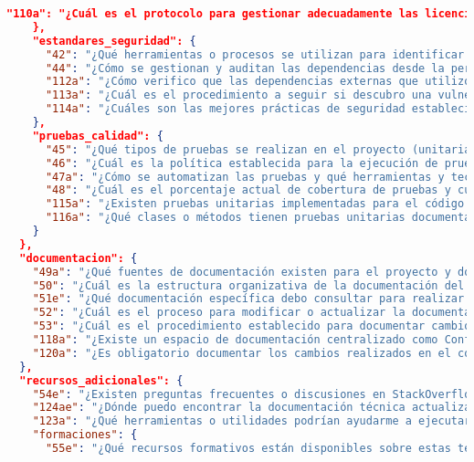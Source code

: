 \begin{lstlisting}[language=json, caption={Listado de elicitación de preguntas procesadas y clasificadas}, label={listado:preguntas}]
      "110a": "¿Cuál es el protocolo para gestionar adecuadamente las licencias de componentes externos?"
    },
    "estandares_seguridad": {
      "42": "¿Qué herramientas o procesos se utilizan para identificar vulnerabilidades de seguridad en el código?",
      "44": "¿Cómo se gestionan y auditan las dependencias desde la perspectiva de seguridad?",
      "112a": "¿Cómo verifico que las dependencias externas que utilizo son seguras y se mantienen actualizadas?",
      "113a": "¿Cuál es el procedimiento a seguir si descubro una vulnerabilidad crítica en una dependencia?",
      "114a": "¿Cuáles son las mejores prácticas de seguridad establecidas que debo aplicar en mi código para este proyecto?"
    },
    "pruebas_calidad": {
      "45": "¿Qué tipos de pruebas se realizan en el proyecto (unitarias, funcionales, integración, rendimiento)?",
      "46": "¿Cuál es la política establecida para la ejecución de pruebas (por commit, por merge request, al final del sprint)?",
      "47a": "¿Cómo se automatizan las pruebas y qué herramientas y tecnologías se utilizan para ello?",
      "48": "¿Cuál es el porcentaje actual de cobertura de pruebas y cuál es el objetivo establecido?",
      "115a": "¿Existen pruebas unitarias implementadas para el código actual? ¿Dónde se encuentran?",
      "116a": "¿Qué clases o métodos tienen pruebas unitarias documentadas y cuáles necesitan implementación?"
    }
  },
  "documentacion": {
    "49a": "¿Qué fuentes de documentación existen para el proyecto y dónde puedo encontrarlas (API, guías, licencias, estándares)?",
    "50": "¿Cuál es la estructura organizativa de la documentación del proyecto?",
    "51e": "¿Qué documentación específica debo consultar para realizar esta tarea concreta?",
    "52": "¿Cuál es el proceso para modificar o actualizar la documentación del proyecto?",
    "53": "¿Cuál es el procedimiento establecido para documentar cambios en el código?",
    "118a": "¿Existe un espacio de documentación centralizado como Confluence para el proyecto?",
    "120a": "¿Es obligatorio documentar los cambios realizados en el código? ¿Qué nivel de detalle se requiere?"
  },
  "recursos_adicionales": {
    "54e": "¿Existen preguntas frecuentes o discusiones en StackOverflow relacionadas con este tema o tecnología?",
    "124ae": "¿Dónde puedo encontrar la documentación técnica actualizada para las tecnologías o herramientas específicas que necesito utilizar?",
    "123a": "¿Qué herramientas o utilidades podrían ayudarme a ejecutar mis tareas de manera más eficiente?",
    "formaciones": {
      "55e": "¿Qué recursos formativos están disponibles sobre estas tecnologías y cuáles son más relevantes para mi tarea actual?",

\end{lstlisting}

